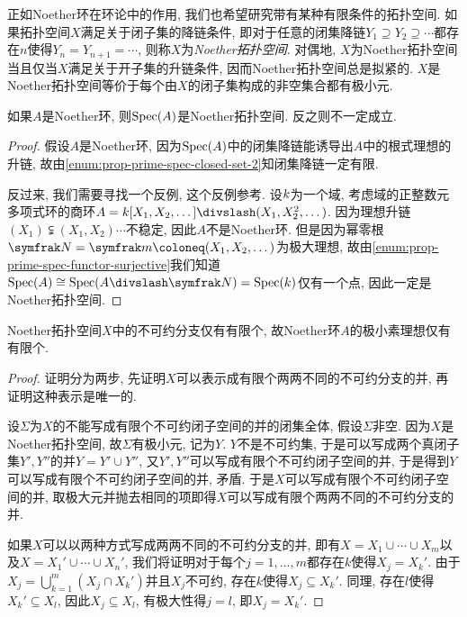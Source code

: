 正如Noether环在环论中的作用, 我们也希望研究带有某种有限条件的拓扑空间. 如果拓扑空间$X$满足关于闭子集的降链条件, 即对于任意的闭集降链$Y_1\supseteq Y_2\supseteq\dotsb$都存在$n$使得$Y_n=Y_{n+1}=\dotsb$, 则称$X$为\emph{Noether拓扑空间}. 对偶地, $X$为Noether拓扑空间当且仅当$X$满足关于开子集的升链条件, 因而Noether拓扑空间总是拟紧的\parencite[79, Exercise 5]{atiyah_introduction_1969}. $X$是Noether拓扑空间等价于每个由$X$的闭子集构成的非空集合都有极小元.

\begin{proposition}
  如果$A$是Noether环, 则$\operatorname{Spec} (A)$是Noether拓扑空间. 反之则不一定成立.
\end{proposition}

\begin{proof}
  假设$A$是Noether环, 因为$\operatorname{Spec} (A)$中的闭集降链能诱导出$A$中的根式理想的升链, 故由\ref{enum:prop-prime-spec-closed-set-2}知闭集降链一定有限.

  反过来, 我们需要寻找一个反例, 这个反例参考. 设$k$为一个域, 考虑域的正整数元多项式环的商环$A=\kk [X_1, X_2, \dotsc]{\divslash}(X_1, X_2^2, \dotsc)$. 因为理想升链$(X_1)\subsetneqq (X_1, X_2)\dotsb$不稳定, 因此$A$不是Noether环. 但是因为幂零根$\nil=\ideal{m}\coloneq (X_1, X_2, \dotsc)$为极大理想, 故由\ref{enum:prop-prime-spec-functor-surjective}我们知道$\Spec (A)\cong\Spec (A{\divslash}\nil)=\Spec (\kk)$仅有一个点, 因此一定是Noether拓扑空间.
\end{proof}

\begin{proposition}
  Noether拓扑空间$X$中的不可约分支仅有有限个, 故Noether环$A$的极小素理想仅有有限个.
\end{proposition}

\begin{proof}
  证明分为两步, 先证明$X$可以表示成有限个两两不同的不可约分支的并, 再证明这种表示是唯一的.

  设$\Sigma$为$X$的不能写成有限个不可约闭子空间的并的闭集全体, 假设$\Sigma$非空. 因为$X$是Noether拓扑空间, 故$\Sigma$有极小元, 记为$Y$. $Y$不是不可约集, 于是可以写成两个真闭子集$Y', Y''$的并$Y=Y'\cup Y''$, 又$Y', Y''$可以写成有限个不可约闭子空间的并, 于是得到$Y$可以写成有限个不可约闭子空间的并, 矛盾. 于是$X$可以写成有限个不可约闭子空间的并, 取极大元并抛去相同的项即得$X$可以写成有限个两两不同的不可约分支的并.

  如果$X$可以以两种方式写成两两不同的不可约分支的并, 即有$X=X_1\cup\dotsb\cup X_m$以及$X=X_1'\cup\dotsb\cup X_n'$, 我们将证明对于每个$j=1, \dotsc, m$都存在$k$使得$X_j=X_k'$. 由于$X_j=\bigcup_{k=1}^m(X_j\cap X_k')$并且$X_j$不可约, 存在$k$使得$X_j\subseteq X_k'$. 同理, 存在$l$使得$X_k'\subseteq X_l$, 因此$X_j\subseteq X_l$, 有极大性得$j=l$, 即$X_j=X_k'$.
\end{proof}
